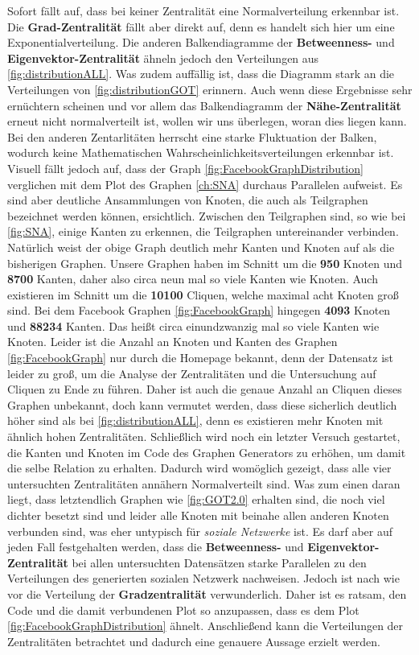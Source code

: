 Sofort fällt auf, dass bei keiner Zentralität eine Normalverteilung erkennbar ist. Die \textbf{Grad-Zentralität} fällt aber direkt auf, denn es handelt sich hier um eine Exponentialverteilung. Die anderen Balkendiagramme der \textbf{Betweenness-} und \textbf{Eigenvektor-Zentralität} ähneln jedoch den Verteilungen aus \ref{fig:distributionALL}. Was zudem auffällig ist, dass die Diagramm stark an die Verteilungen von \ref{fig:distributionGOT} erinnern. Auch wenn diese Ergebnisse sehr ernüchtern scheinen und vor allem das Balkendiagramm der \textbf{Nähe-Zentralität} erneut nicht normalverteilt ist, wollen wir uns überlegen, woran dies liegen kann. Bei den anderen Zentarlitäten herrscht eine starke Fluktuation der Balken, wodurch keine Mathematischen Wahrscheinlichkeitsverteilungen erkennbar ist. Visuell fällt jedoch auf, dass der Graph \ref{fig:FacebookGraphDistribution} verglichen mit dem Plot des Graphen \ref{ch:SNA} durchaus Parallelen aufweist. Es sind aber deutliche Ansammlungen von Knoten, die auch als Teilgraphen bezeichnet werden können, ersichtlich. Zwischen den Teilgraphen sind, so wie bei \ref{fig:SNA}, einige Kanten zu erkennen, die Teilgraphen untereinander verbinden. Natürlich weist der obige Graph deutlich mehr Kanten und Knoten auf als die bisherigen Graphen. Unsere Graphen haben im Schnitt um die \textbf{950} Knoten und \textbf{8700} Kanten, daher also circa neun mal so viele Kanten wie Knoten. Auch existieren im Schnitt um die \textbf{10100} Cliquen, welche maximal acht Knoten groß sind. Bei dem Facebook Graphen \ref{fig:FacebookGraph} hingegen \textbf{4093} Knoten und \textbf{88234} Kanten. Das heißt circa einundzwanzig mal so viele Kanten wie Knoten. Leider ist die Anzahl an Knoten und Kanten des Graphen \ref{fig:FacebookGraph} nur durch die Homepage \cite{FBData} bekannt, denn der Datensatz ist leider zu groß, um die Analyse der Zentralitäten und die Untersuchung auf Cliquen zu Ende zu führen. Daher ist auch die genaue Anzahl an Cliquen dieses Graphen unbekannt, doch kann vermutet werden, dass diese sicherlich deutlich höher sind als bei \ref{fig:distributionALL}, denn es existieren mehr Knoten mit ähnlich hohen Zentralitäten. Schließlich wird noch ein letzter Versuch gestartet, die Kanten und Knoten im Code des Graphen Generators zu erhöhen, um damit die selbe Relation zu erhalten. Dadurch wird womöglich gezeigt, dass alle vier untersuchten Zentralitäten annähern Normalverteilt sind. Was zum einen daran liegt, dass letztendlich Graphen wie \ref{fig:GOT2.0} erhalten sind, die noch viel dichter besetzt sind und leider alle Knoten mit beinahe allen anderen Knoten verbunden sind, was eher untypisch für \textit{soziale Netzwerke} ist. Es darf aber auf jeden Fall festgehalten werden, dass die \textbf{Betweenness-} und \textbf{Eigenvektor-Zentralität} bei allen untersuchten Datensätzen starke Parallelen zu den Verteilungen des generierten sozialen Netzwerk nachweisen. Jedoch ist nach wie vor die Verteilung der \textbf{Gradzentralität} verwunderlich. Daher ist es ratsam, den Code und die damit verbundenen Plot so anzupassen, dass es dem Plot \ref{fig:FacebookGraphDistribution} ähnelt. Anschließend kann die Verteilungen der Zentralitäten betrachtet und dadurch eine genauere Aussage erzielt werden. 


